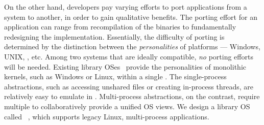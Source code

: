 On the other hand, developers pay varying efforts to port applications
from a system to another,
in order to gain qualitative benefits.
The porting effort for an application can range from
recompilation of the binaries
to fundamentally redesigning the implementation.
Essentially,
the difficulty of porting is determined by the distinction between the \emph{personalities} of platforms
--- Windows, UNIX, \liboses{}, etc.
Among two systems that are ideally compatible, \emph{no} porting efforts will be needed.
Existing library OSes~\citep{porter11drawbridge, baumann13bascule, baumann14haven}
provide the personalities of monolithic kernels, such as Windows or Linux,
within a single \picoproc{}.
The single-process abstractions,
such as accessing unshared files or creating in-process threads,
are relatively easy to emulate in \liboses{}.
Multi-process abstractions, on the contrast, require
multiple \picoprocs{} to collaboratively provide a unified OS views.
We design a library OS called \term{\graphene{}}~\citep{tsai14graphene},
which supports legacy Linux, multi-process applications.
